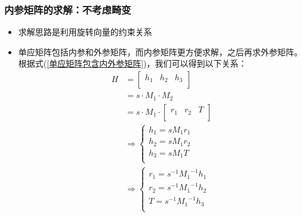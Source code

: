 \documentclass[aspectratio=43]{beamer}
\begin{document}
	\begin{frame}
		\frametitle{内参矩阵的求解：不考虑畸变}
		\begin{itemize}
			\item 求解思路是利用旋转向量的约束关系
			\item 单应矩阵包括内参和外参矩阵，而内参矩阵更方便求解，之后再求外参矩阵。
			根据式(\ref{单应矩阵包含内外参矩阵})，我们可以得到以下关系：\\
			\begin{align}
				H &=\left[ \begin{matrix}
					h_1&		h_2&		h_3\\
				\end{matrix} \right] \nonumber
				\\
				&=s \cdot M_1\cdot M_2 \nonumber
				\\
				&=s \cdot M_1\cdot \left[ \begin{matrix}
					r_1&		r_2&		T\\
				\end{matrix} \right] \nonumber
				\\
				&	\Rightarrow \begin{cases}
					h_1=sM_1r_1\\
					h_2=sM_1r_2\\
					h_3=sM_1T\\
				\end{cases} \nonumber
				\\
				&	\Rightarrow \begin{cases}
					r_1=s ^{-1} {M_1}^{-1}h_1\\
					r_2=s ^{-1} {M_1}^{-1}h_2\\
					T=s ^{-1} {M_1}^{-1}h_3\\
				\end{cases}
			\end{align}
		\end{itemize}
	\end{frame}	
	
\end{document}
